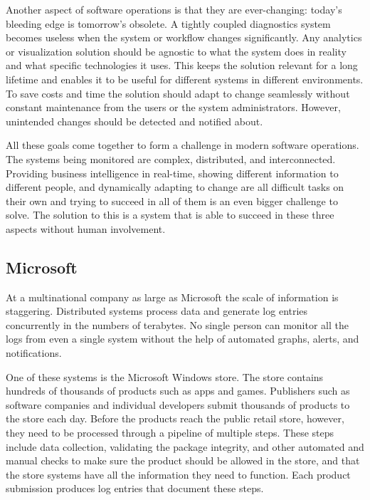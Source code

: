 Another aspect of software operations is that they are ever-changing: today's bleeding edge is tomorrow's obsolete. 
A tightly coupled diagnostics system becomes useless when the system or workflow changes significantly. 
Any analytics or visualization solution should be agnostic to what the system does in reality and what specific technologies it uses. 
This keeps the solution relevant for a long lifetime and enables it to be useful for different systems in different environments. 
To save costs and time the solution should adapt to change seamlessly without constant maintenance from the users or the system administrators. However, unintended changes should be detected and notified about.

All these goals come together to form a challenge in modern software operations.
The systems being monitored are complex, distributed, and interconnected.
Providing business intelligence in real-time, showing different information to different people, and dynamically adapting to change are all difficult tasks on their own and trying to succeed in all of them is an even bigger challenge to solve.
The solution to this is a system that is able to succeed in these three aspects without human involvement.

\subsection{Microsoft}
At a multinational company as large as Microsoft the scale of information is staggering.
Distributed systems process data and generate log entries concurrently in the numbers of terabytes.
No single person can monitor all the logs from even a single system without the help of automated
graphs, alerts, and notifications.  

One of these systems is the Microsoft Windows store. The store contains hundreds of thousands of products
such as apps and games. Publishers such as software companies and individual developers submit thousands of 
products to the store each day. Before the products reach the public retail store, however, they need to be processed
through a pipeline of multiple steps. These steps include data collection, validating the package integrity, and
other automated and manual checks to make sure the product should be allowed in the store,
and that the store systems have all the information they need to function.
Each product submission produces log entries that document these steps.

